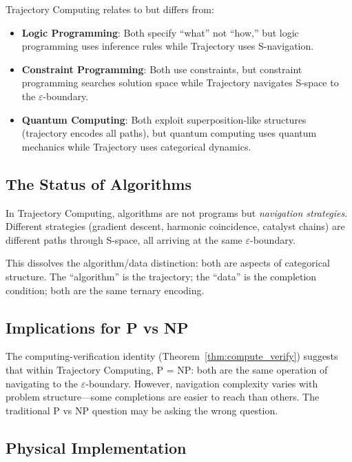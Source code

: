 \documentclass[twocolumn,10pt]{article}
\theoremstyle{remark}
\newcommand{\eps}{\varepsilon}
\begin{document}
Trajectory Computing relates to but differs from:

\begin{itemize}
    \item \textbf{Logic Programming}: Both specify ``what'' not ``how,'' but logic programming uses inference rules while Trajectory uses S-navigation.

    \item \textbf{Constraint Programming}: Both use constraints, but constraint programming searches solution space while Trajectory navigates S-space to the $\eps$-boundary.

    \item \textbf{Quantum Computing}: Both exploit superposition-like structures (trajectory encodes all paths), but quantum computing uses quantum mechanics while Trajectory uses categorical dynamics.
\end{itemize}

\subsection{The Status of Algorithms}

In Trajectory Computing, algorithms are not programs but \textit{navigation strategies}. Different strategies (gradient descent, harmonic coincidence, catalyst chains) are different paths through S-space, all arriving at the same $\eps$-boundary.

This dissolves the algorithm/data distinction: both are aspects of categorical structure. The ``algorithm'' is the trajectory; the ``data'' is the completion condition; both are the same ternary encoding.

\subsection{Implications for P vs NP}

The computing-verification identity (Theorem~\ref{thm:compute_verify}) suggests that within Trajectory Computing, P = NP: both are the same operation of navigating to the $\eps$-boundary. However, navigation complexity varies with problem structure---some completions are easier to reach than others. The traditional P vs NP question may be asking the wrong question.

\subsection{Physical Implementation}
\end{document}
